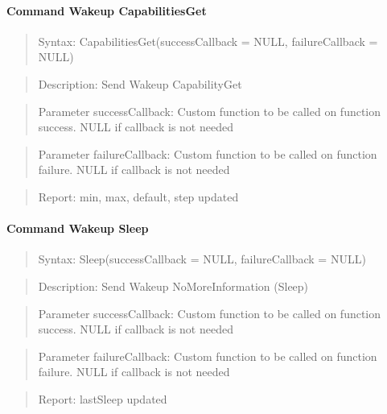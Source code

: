 \paragraph{Command Wakeup CapabilitiesGet}
\begin{quote}Syntax: CapabilitiesGet(successCallback = NULL, failureCallback = NULL)\end{quote}
\begin{quote}Description: Send Wakeup CapabilityGet\end{quote}
\begin{quote}Parameter successCallback: Custom function to be called on function success. NULL if callback is not needed\end{quote}
\begin{quote}Parameter failureCallback: Custom function to be called on function failure. NULL if callback is not needed\end{quote}
\begin{quote}Report: min, max, default, step updated\end{quote}

\paragraph{Command Wakeup Sleep}
\begin{quote}Syntax: Sleep(successCallback = NULL, failureCallback = NULL)\end{quote}
\begin{quote}Description: Send Wakeup NoMoreInformation (Sleep)\end{quote}
\begin{quote}Parameter successCallback: Custom function to be called on function success. NULL if callback is not needed\end{quote}
\begin{quote}Parameter failureCallback: Custom function to be called on function failure. NULL if callback is not needed\end{quote}
\begin{quote}Report: lastSleep updated\end{quote}


